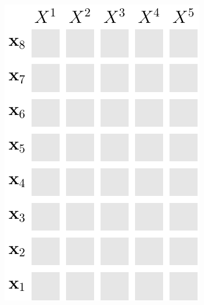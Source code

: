 \documentclass[xcolor={usenames,dvipsnames,svgnames}, compress, aspectratio=169, 11pt]{beamer}
\begin{document}
{
  \begin{frame}
    \titlepage
  \end{frame}
}



  

\newcommand{\customcite}[1]{\footnote{\tiny \citeauthor{#1},
    \citetitle{#1}, \citeyear{#1}}}
\newcommand{\customcitenomark}[1]{\footnotenomarkleft{\tiny
    \citeauthor{#1}, \citetitle{#1}, \citeyear{#1}}}
\newcommand{\customcitetext}[1]{\footnotenomarkleft{\tiny \citeauthor{#1}, \citetitle{#1}, \citeyear{#1}}}



\begin{frame}[t]
  \frametitle{}
  \large
  \begin{minipage}[t]{0.4\linewidth}\vspace{15pt}
    \vspace{40pt}
    \includegraphics[width=.5\linewidth]{figures/abda-grid-empty}
  \end{minipage}\hfill\begin{minipage}[t]{0.55\linewidth}
    \vspace{20pt}
  \end{minipage}  
\end{frame}
\end{document}
